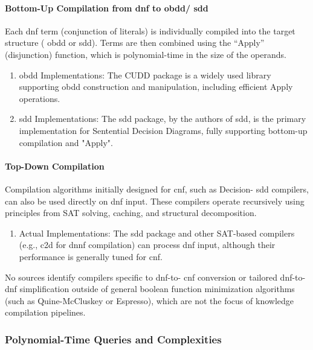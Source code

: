 \paragraph{Bottom-Up Compilation from \acrshort{dnf} to  \acrshort{obdd}/ \acrshort{sdd}}
Each \acrshort{dnf} term (conjunction of literals) is individually compiled into the target structure ( \acrshort{obdd} or  \acrshort{sdd}). Terms are then combined using the ``Apply'' (disjunction) function, which is polynomial-time in the size of the operands.
\begin{enumerate}
    \item  \acrshort{obdd} Implementations: The CUDD package is a widely used library supporting  \acrshort{obdd} construction and manipulation, including efficient Apply operations.
    \item  \acrshort{sdd} Implementations: The  \acrshort{sdd} package, by the authors of  \acrshort{sdd}, is the primary implementation for Sentential Decision Diagrams, fully supporting bottom-up compilation and "Apply".
\end{enumerate}

\paragraph{Top-Down Compilation}
Compilation algorithms initially designed for  \acrshort{cnf}, such as Decision- \acrshort{sdd} compilers, can also be used directly on \acrshort{dnf} input. These compilers operate recursively using principles from SAT solving, caching, and structural decomposition.
\begin{enumerate}
    \item Actual Implementations: The  \acrshort{sdd} package and other SAT-based compilers (e.g., c2d for  \acrshort{dnnf} compilation) can process \acrshort{dnf} input, although their performance is generally tuned for  \acrshort{cnf}.
\end{enumerate}

No sources identify compilers specific to \acrshort{dnf}-to- \acrshort{cnf} conversion or tailored \acrshort{dnf}-to-\acrshort{dnf} simplification outside of general boolean function minimization algorithms (such as Quine-McCluskey or Espresso), which are not the focus of knowledge compilation pipelines.

\subsubsection{Polynomial-Time Queries and Complexities}
